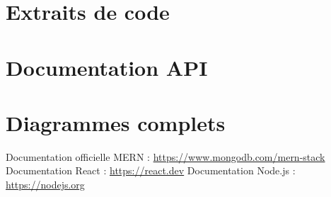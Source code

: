\documentclass[12pt,a4paper]{report}
\begin{document}
\section{Extraits de code}
\section{Documentation API}
\section{Diagrammes complets}

\begin{thebibliography}{9}
 Documentation officielle MERN : \url{https://www.mongodb.com/mern-stack}
 Documentation React : \url{https://react.dev}
 Documentation Node.js : \url{https://nodejs.org}
\end{thebibliography}
\end{document}
